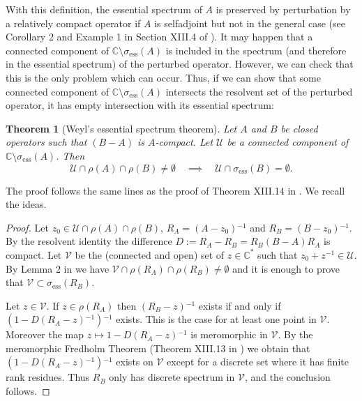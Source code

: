 \documentclass[10pt, a4paper,reqno]{amsart}
\theoremstyle{plain}
\newtheorem{theorem}{{Theorem}}[section]
\theoremstyle{definition}
\theoremstyle{remark}
\begin{document}
With this definition, the essential spectrum of $A$ is preserved by perturbation by a relatively compact operator if $A$ is selfadjoint but not in the general case (see Corollary 2 and Example 1 in Section XIII.4 of \cite{rs4}). It may happen that a connected component of ${\mathbb{C}} \setminus {\sigma}_{{\mathrm{ess}}}(A)$ is included in the spectrum (and therefore in the essential spectrum) of the perturbed operator. However, we can check that this is the only problem which can occur. Thus, if we can show that some connected component of ${\mathbb{C}} \setminus {\sigma}_{{\mathrm{ess}}}(A)$ intersects the resolvent set of the perturbed operator, it has empty intersection with its essential spectrum:

\begin{theorem}[Weyl's essential spectrum theorem] \label{th-weyl}
Let $A$ and $B$ be closed operators such that $(B-A)$ is $A$-compact. Let ${{\mathcal U}}$ be a connected component of ${\mathbb{C}} \setminus {\sigma}_{{\mathrm{ess}}}(A)$. Then 
\[
{{\mathcal U}} \cap \rho(A) \cap \rho(B) \neq \emptyset \quad \implies \quad {{\mathcal U}} \cap {\sigma}_{{\mathrm{ess}}}(B) = \emptyset.
\]
\end{theorem}

The proof follows the same lines as the proof of Theorem XIII.14 in \cite{rs4}. We recall the ideas.

\begin{proof}
Let $z_0 \in {{\mathcal U}} \cap \rho(A) \cap \rho(B)$, $R_A = (A-z_0){^{-1}}$ and $R_B = (B-z_0){^{-1}}$. By the resolvent identity the difference $D := R_A - R_B = R_B (B-A) R_A$ is compact. Let ${{\mathcal V}}$ be the (connected and open) set of $z \in {\mathbb{C}}^*$ such that $z_0 + z{^{-1}} \in {{\mathcal U}}$. By Lemma 2 in \cite[Section XIII.4]{rs4} we have ${{\mathcal V}} \cap \rho(R_A) \cap \rho(R_B) \neq \emptyset$ and it is enough to prove that ${{\mathcal V}} \subset {\sigma}_{{\mathrm{ess}}}(R_B)$.

Let $z \in {{\mathcal V}}$. If $z \in \rho(R_A)$ then $(R_B-z){^{-1}}$ exists if and only if $(1 - D (R_A-z){^{-1}}){^{-1}}$ exists. This is the case for at least one point in ${{\mathcal V}}$. Moreover the map $z \mapsto 1 - D (R_A-z){^{-1}}$ is meromorphic in ${{\mathcal V}}$. By the meromorphic Fredholm Theorem (Theorem XIII.13 in \cite{rs4}) we obtain that $(1 - D (R_A-z){^{-1}}){^{-1}}$ exists on ${{\mathcal V}}$ except for a discrete set where it has finite rank residues. Thus $R_B$ only has discrete spectrum in ${{\mathcal V}}$, and the conclusion follows.
\end{proof}
\end{document}
